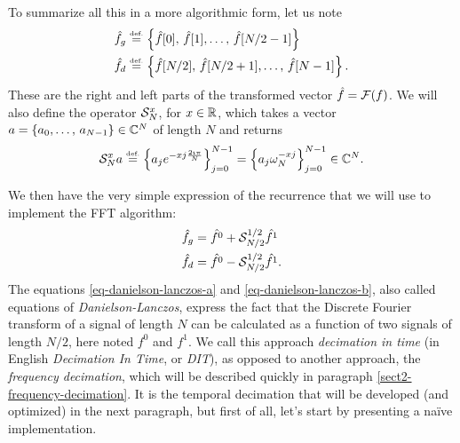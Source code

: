  
\begin{defn}
 \label{notation-45} \label{notation-46} To summarize all this in a more algorithmic form, let us note
\begin{align}
\label{eq-part-gd}
\hat{f}_g & \stackrel{\mbox{\upshape\tiny def.}}{=} \left\{\hat{f}[0], \, \hat{f}[1], \ldots, \, \hat{f}[N / 2-1] \right\} \\
\hat{f}_d & \stackrel{\mbox{\upshape\tiny def.}}{=} \left\{\hat{f}[N / 2], \, \hat{f}[N / 2 + 1], \ldots, \, \hat{f}[N -1] \right\}.
\end{align}
These are the right and left parts of the transformed vector $ \hat{f} = \mathcal{F}(f) $. We will also define the operator $ \mathcal{S}_N^x $, for $ x \in \mathbb{R} $, which takes a vector $ a = \{a_0, \ldots, \, a_{N-1}\} \in \mathbb{C}^N $ of length $N$ and returns
\begin{equation}
\label{eq-operator-S}
\mathcal{S}_N^xa \stackrel{\mbox{\upshape\tiny def.}}{=} \left\{a_j e^{- xj \frac{2 \imath \pi}{N}} \right\}_{j = 0}^{N-1} = \left\{a_j \omega_N^{- xj} \right\}_{j = 0}^{N-1} \in \mathbb{C}^N.
\end{equation}
\end{defn}
We then have the very simple expression of the recurrence that we will use to implement the FFT algorithm: 
\begin{align}
\label{eq-danielson-lanczos-a}
\hat{f}_g & = \hat{f^0} + \mathcal{S}_{N / 2}^{1/2} \hat{f^1} \\
\label{eq-danielson-lanczos-b}
\hat{f}_d & = \hat{f^0} - \mathcal{S}_{N / 2}^{1/2} \hat{f^1}.
\end{align}
 The equations \eqref{eq-danielson-lanczos-a} and \eqref{eq-danielson-lanczos-b}, also called equations of \textit{Danielson-Lanczos}, express the fact that the Discrete Fourier transform of a signal of length $N$ can be calculated as a function of two signals of length $ N / 2 $, here noted $ f^0 $ and $ f^1 $. We call this approach \textit{decimation in time} (in English \textit{Decimation In Time}, or \textit{DIT}), as opposed to another approach, the \textit{frequency decimation}, which will be described quickly in paragraph \ref{sect2-frequency-decimation}. It is the temporal decimation that will be developed (and optimized) in the next paragraph, but first of all, let's start by presenting a naïve implementation.
 
